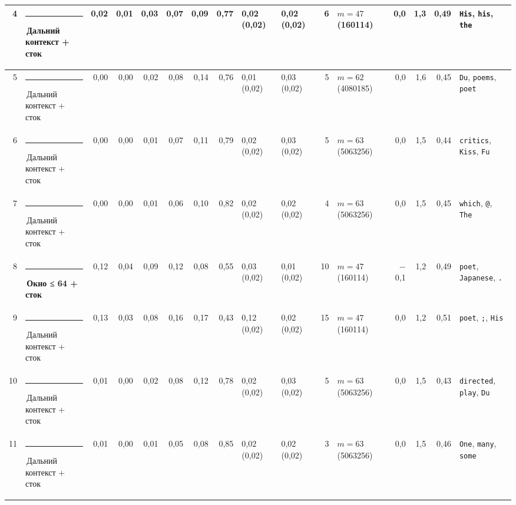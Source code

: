 \documentclass[10pt]{article}
\begin{document}
\begin{minipage}{\linewidth}
\begin{center}
{\begin{tabular}{|r|l|r|r|r|r|r|r|l|l|r|l|r|r|r|l|}
4 & \textcolor[HTML]{C3C2B7}{\rule{0.62em}{0.62em}}\,Дальний контекст + сток & 0,02 & 0,01 & 0,03 & 0,07 & 0,09 & 0,77 & 0,02 (0,02) & 0,02 (0,02) & 6 & $m{=}47$ (160114) & 0,0 & 1,3 & 0,49 & \texttt{\textvisiblespace{}His}, \texttt{\textvisiblespace{}his}, \texttt{\textvisiblespace{}the} \\ \hline
5 & \textcolor[HTML]{C3C2B7}{\rule{0.62em}{0.62em}}\,Дальний контекст + сток & 0,00 & 0,00 & 0,02 & 0,08 & 0,14 & 0,76 & 0,01 (0,02) & 0,03 (0,02) & 5 & $m{=}62$ (4080185) & 0,0 & 1,6 & 0,45 & \texttt{\textvisiblespace{}Du}, \texttt{\textvisiblespace{}poems}, \texttt{\textvisiblespace{}poet} \\ \hline
6 & \textcolor[HTML]{C3C2B7}{\rule{0.62em}{0.62em}}\,Дальний контекст + сток & 0,00 & 0,00 & 0,01 & 0,07 & 0,11 & 0,79 & 0,02 (0,02) & 0,03 (0,02) & 5 & $m{=}63$ (5063256) & 0,0 & 1,5 & 0,44 & \texttt{\textvisiblespace{}critics}, \texttt{\textvisiblespace{}Kiss}, \texttt{\textvisiblespace{}Fu} \\ \hline
7 & \textcolor[HTML]{C3C2B7}{\rule{0.62em}{0.62em}}\,Дальний контекст + сток & 0,00 & 0,00 & 0,01 & 0,06 & 0,10 & 0,82 & 0,02 (0,02) & 0,02 (0,02) & 4 & $m{=}63$ (5063256) & 0,0 & 1,5 & 0,45 & \texttt{\textvisiblespace{}which}, \texttt{\textvisiblespace{}@}, \texttt{\textvisiblespace{}The} \\ \hline
8 & \textcolor[HTML]{EDA100}{\rule{0.62em}{0.62em}}\,\textbf{Окно ≤ 64 + сток} & 0,12 & 0,04 & 0,09 & 0,12 & 0,08 & 0,55 & 0,03 (0,02) & 0,01 (0,02) & 10 & $m{=}47$ (160114) & $-$0,1 & 1,2 & 0,49 & \texttt{\textvisiblespace{}poet}, \texttt{\textvisiblespace{}Japanese}, \texttt{\textvisiblespace{}.} \\ \hline
9 & \textcolor[HTML]{C3C2B7}{\rule{0.62em}{0.62em}}\,Дальний контекст + сток & 0,13 & 0,03 & 0,08 & 0,16 & 0,17 & 0,43 & 0,12 (0,02) & 0,02 (0,02) & 15 & $m{=}47$ (160114) & 0,0 & 1,2 & 0,51 & \texttt{\textvisiblespace{}poet}, \texttt{\textvisiblespace{};}, \texttt{\textvisiblespace{}His} \\ \hline
10 & \textcolor[HTML]{C3C2B7}{\rule{0.62em}{0.62em}}\,Дальний контекст + сток & 0,01 & 0,00 & 0,02 & 0,08 & 0,12 & 0,78 & 0,02 (0,02) & 0,03 (0,02) & 5 & $m{=}63$ (5063256) & 0,0 & 1,5 & 0,43 & \texttt{\textvisiblespace{}directed}, \texttt{\textvisiblespace{}play}, \texttt{\textvisiblespace{}Du} \\ \hline
11 & \textcolor[HTML]{C3C2B7}{\rule{0.62em}{0.62em}}\,Дальний контекст + сток & 0,01 & 0,00 & 0,01 & 0,05 & 0,08 & 0,85 & 0,02 (0,02) & 0,02 (0,02) & 3 & $m{=}63$ (5063256) & 0,0 & 1,5 & 0,46 & \texttt{\textvisiblespace{}One}, \texttt{\textvisiblespace{}many}, \texttt{\textvisiblespace{}some} \\ \hline

\end{tabular}}
\end{center}
\end{minipage}
\end{document}
